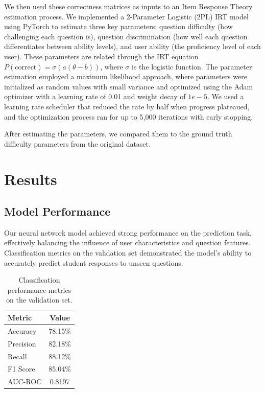 \documentclass[11pt]{article}
\begin{document}
We then used these correctness matrices as inputs to an Item Response Theory estimation process. We implemented a 2-Parameter Logistic (2PL) IRT model using PyTorch to estimate three key parameters: question difficulty (how challenging each question is), question discrimination (how well each question differentiates between ability levels), and user ability (the proficiency level of each user). These parameters are related through the IRT equation $P(\text{correct}) = \sigma(a(\theta - b))$, where $\sigma$ is the logistic function. The parameter estimation employed a maximum likelihood approach, where parameters were initialized as random values with small variance and optimized using the Adam optimizer with a learning rate of 0.01 and weight decay of $1e-5$. We used a learning rate scheduler that reduced the rate by half when progress plateaued, and the optimization process ran for up to 5,000 iterations with early stopping.

After estimating the parameters, we compared them to the ground truth difficulty parameters from the original dataset.

\section{Results}

\subsection{Model Performance}

Our neural network model achieved strong performance on the prediction task, effectively balancing the influence of user characteristics and question features. Classification metrics on the validation set demonstrated the model's ability to accurately predict student responses to unseen questions.

\begin{table}[!ht] %
  \centering
  \begin{tabular}{lc}
        \toprule %
        \textbf{Metric} & \textbf{Value} \\
        \midrule %
        Accuracy & 78.15\% \\
        Precision & 82.18\% \\
        Recall & 88.12\% \\
        F1 Score & 85.04\% \\
        AUC-ROC & 0.8197 \\
        \bottomrule %
  \end{tabular}
    \caption{Classification performance metrics on the validation set.}
    \label{tab:classification-metrics}
\end{table}
\end{document}
